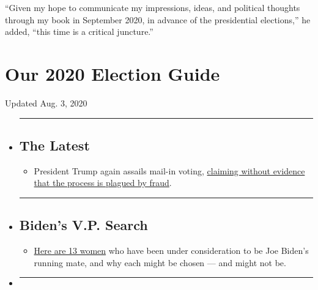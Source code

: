 ``Given my hope to communicate my impressions, ideas, and political
thoughts through my book in September 2020, in advance of the
presidential elections,'' he added, ``this time is a critical
juncture.''

\hypertarget{our-2020-election-guide}{%
\section{Our 2020 Election Guide}\label{our-2020-election-guide}}

Updated Aug. 3, 2020

\begin{itemize}
\item
  \begin{center}\rule{0.5\linewidth}{\linethickness}\end{center}

  \hypertarget{the-latest}{%
  \subsection{The Latest}\label{the-latest}}

  \begin{itemize}
  \tightlist
  \item
    President Trump again assails mail-in voting,
    \href{https://www.nytimes.com/2020/08/03/us/politics/trump-mail-in-voting.html?action=click\&pgtype=Article\&state=default\&region=BELOW_MAIN_CONTENT\&context=storylines_guide}{claiming
    without evidence that the process is plagued by fraud}.
  \end{itemize}
\item
  \begin{center}\rule{0.5\linewidth}{\linethickness}\end{center}

  \hypertarget{bidens-vp-search}{%
  \subsection{Biden's V.P. Search}\label{bidens-vp-search}}

  \begin{itemize}
  \tightlist
  \item
    \href{https://www.nytimes.com/article/biden-vice-president-2020.html?action=click\&pgtype=Article\&state=default\&region=BELOW_MAIN_CONTENT\&context=storylines_guide}{Here
    are 13 women} who have been under consideration to be Joe Biden's
    running mate, and why each might be chosen --- and might not be.
  \end{itemize}
\item
  \begin{center}\rule{0.5\linewidth}{\linethickness}\end{center}


\end{itemize}
